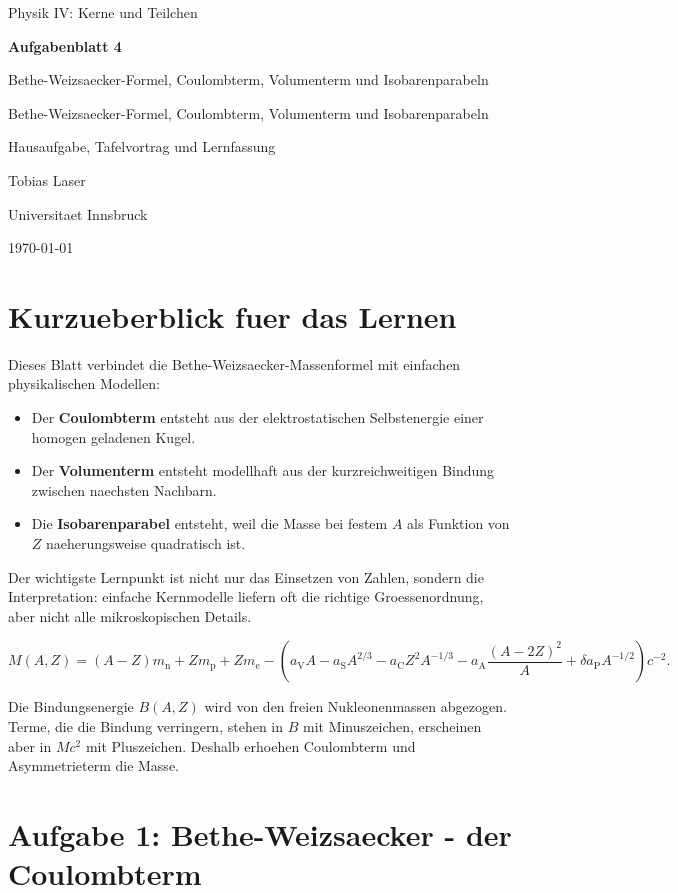 \documentclass[11pt,a4paper]{scrartcl}
\newcommand{\CourseTitle}{Physik IV: Kerne und Teilchen}
\newcommand{\DocumentKind}{Hausaufgabe, Tafelvortrag und Lernfassung}
\newcommand{\DocumentTitle}{Aufgabenblatt 4}
\newcommand{\DocumentSubtitle}{Bethe-Weizsaecker-Formel, Coulombterm, Volumenterm und Isobarenparabeln}
\newcommand{\AuthorName}{Tobias Laser}
\newcommand{\InstitutionName}{Universitaet Innsbruck}
\newcommand{\SubmissionDate}{\today}
\newcommand{\makeuniversitytitle}{%
    \begin{titlepage}
        \centering
        \vspace*{2cm}
        {\Large \CourseTitle\par}
        \vspace{1.2cm}
        {\huge\bfseries \DocumentTitle\par}
        \ifx\DocumentSubtitle\empty\else
            \vspace{0.4cm}
            {\Large \DocumentSubtitle\par}
        \fi
        \vspace{1cm}
        {\Large \DocumentKind\par}
        \vfill
        {\large \AuthorName\par}
        \vspace{0.2cm}
        {\large \InstitutionName\par}
        \vspace{0.8cm}
        {\large \SubmissionDate\par}
    \end{titlepage}
    \pagenumbering{arabic}
}
\theoremstyle{definition}
\theoremstyle{plain}
\theoremstyle{remark}
\newcommand{\aV}{a_{\mathrm V}}
\newcommand{\aS}{a_{\mathrm S}}
\newcommand{\aC}{a_{\mathrm C}}
\newcommand{\aA}{a_{\mathrm A}}
\newcommand{\aP}{a_{\mathrm P}}
\begin{document}
\makeuniversitytitle
\tableofcontents
\newpage

\section*{Kurzueberblick fuer das Lernen}

\begin{summarybox}[title=Was dieses Blatt prueft]
Dieses Blatt verbindet die Bethe-Weizsaecker-Massenformel mit einfachen physikalischen Modellen:
\begin{itemize}
    \item Der \textbf{Coulombterm} entsteht aus der elektrostatischen Selbstenergie einer homogen geladenen Kugel.
    \item Der \textbf{Volumenterm} entsteht modellhaft aus der kurzreichweitigen Bindung zwischen naechsten Nachbarn.
    \item Die \textbf{Isobarenparabel} entsteht, weil die Masse bei festem $A$ als Funktion von $Z$ naeherungsweise quadratisch ist.
\end{itemize}
Der wichtigste Lernpunkt ist nicht nur das Einsetzen von Zahlen, sondern die Interpretation: einfache Kernmodelle liefern oft die richtige Groessenordnung, aber nicht alle mikroskopischen Details.
\end{summarybox}

\begin{formulabox}[title=Bethe-Weizsaecker-Massenformel in der verwendeten Form]
\[
M(A,Z)=(A-Z)m_{\mathrm n}+Z m_{\mathrm p}+Z m_{\mathrm e}
-\left(
\aV A-\aS A^{2/3}-\aC Z^2 A^{-1/3}
-\aA\frac{(A-2Z)^2}{A}+\delta\aP A^{-1/2}
\right)c^{-2}.
\]
\end{formulabox}

\begin{notebox}[title=Vorzeichenlogik]
Die Bindungsenergie $B(A,Z)$ wird von den freien Nukleonenmassen abgezogen. Terme, die die Bindung verringern, stehen in $B$ mit Minuszeichen, erscheinen aber in $M c^2$ mit Pluszeichen. Deshalb erhoehen Coulombterm und Asymmetrieterm die Masse.
\end{notebox}

\newpage

\section{Aufgabe 1: Bethe-Weizsaecker - der Coulombterm}
\end{document}
